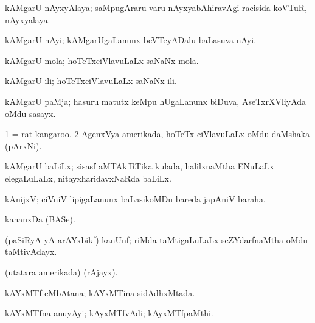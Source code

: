 \bentry
{}
\gl{\nA}
\bmng
kAMgarU nAyxyAlaya; saMpugAraru \mo varu nAyxyabAhiravAgi racisida koVTuR, nAyxyalaya. 
\emng
\eentry

\bentry
{}
\gl{\nA}
\bmng
kAMgarU nAyi; kAMgarUgaLanunx beVTeyADalu baLasuva nAyi. 
\emng
\eentry

\bentry
{}
\gl{\nA}
\bmng
kAMgarU mola; hoTeTxciVlavuLaLx saNaNx mola. 
\emng
\eentry

\bentry
{}
\gl{\nA}
\bmng
kAMgarU ili; hoTeTxciVlavuLaLx saNaNx ili. 
\emng
\eentry

\bentry
{}
\gl{\nA}
\bmng
kAMgarU paMja; hasuru matutx keMpu hUgaLanunx biDuva, AseTxrXVliyAda oMdu sasayx. 
\emng
\eentry

\bentry
{}
\gl{\nA}
\bmng
\bnum
\num{1} = \hyperref{kandict_r.pdf}{R}{rat kangaroo}{rat kangaroo}. 
\num{2} AgenxVya amerikada, hoTeTx ciVlavuLaLx oMdu daMshaka (pArxNi).  
\enum
\emng
\eentry

\bentry
{}
\gl{\nA}
\bmng
kAMgarU baLiLx; sisasf aMTAkfRTika kulada, halilxnaMtha ENuLaLx elegaLuLaLx, nitayxharidavxNaRda baLiLx. 
\emng
\eentry

\bentry
{}
\gl{\nA}
\bmng
kAnijxV; ciVniV lipigaLanunx baLasikoMDu bareda japAniV baraha. 
\emng
\eentry

\bentry
{}
\gl{\nA}
\bmng
kananxDa (BASe). 
\emng
\eentry

\bentry
{}
\gl{\nA}
\bmng
(paSiRyA yA arAYxbikf) kanUnf; riMda  taMtigaLuLaLx seZYdarfnaMtha oMdu taMtivAdayx. 
\emng
\eentry

\bentry
{}
\gl{\saMkiSx}
\bmng
(utatxra amerikada)  (rAjayx). 
\emng
\eentry

\bentry
{}
\gl{\gu}
\bmng
kAYxMTf eMbAtana; kAYxMTina sidAdhxMtada. 
\emng
\eentry

\bentry
{}
\gl{\nA}
\bmng
kAYxMTfna anuyAyi; kAyxMTfvAdi; kAyxMTfpaMthi. 
\emng
\eentry

